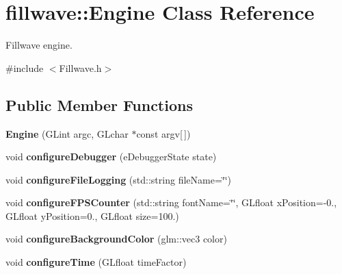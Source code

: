 \hypertarget{classfillwave_1_1Engine}{}\section{fillwave\+:\+:Engine Class Reference}
\label{classfillwave_1_1Engine}


Fillwave engine.  




{\ttfamily \#include $<$Fillwave.\+h$>$}

\subsection*{Public Member Functions}
\begin{DoxyCompactItemize}
\item 
\hypertarget{classfillwave_1_1Engine_a6348c216dda393c0ec969a1871f286b0}{}{\bfseries Engine} (G\+Lint argc, G\+Lchar $\ast$const argv\mbox{[}$\,$\mbox{]})\label{classfillwave_1_1Engine_a6348c216dda393c0ec969a1871f286b0}

\item 
\hypertarget{classfillwave_1_1Engine_a8ab70999c6424f4aff5eea39a23793fb}{}void {\bfseries configure\+Debugger} (e\+Debugger\+State state)\label{classfillwave_1_1Engine_a8ab70999c6424f4aff5eea39a23793fb}

\item 
\hypertarget{classfillwave_1_1Engine_a79b8431174a0e21ee33550bb17435572}{}void {\bfseries configure\+File\+Logging} (std\+::string file\+Name=\char`\"{}\char`\"{})\label{classfillwave_1_1Engine_a79b8431174a0e21ee33550bb17435572}

\item 
\hypertarget{classfillwave_1_1Engine_afeda6ab5368be17d98e6c1a703968ddd}{}void {\bfseries configure\+F\+P\+S\+Counter} (std\+::string font\+Name=\char`\"{}\char`\"{}, G\+Lfloat x\+Position=-\/0., G\+Lfloat y\+Position=0., G\+Lfloat size=100.)\label{classfillwave_1_1Engine_afeda6ab5368be17d98e6c1a703968ddd}

\item 
\hypertarget{classfillwave_1_1Engine_a317929adad6bac338fe9de406256aafc}{}void {\bfseries configure\+Background\+Color} (glm\+::vec3 color)\label{classfillwave_1_1Engine_a317929adad6bac338fe9de406256aafc}

\item 
\hypertarget{classfillwave_1_1Engine_afca8e958d13dc33cbe336db17bd2f1c7}{}void {\bfseries configure\+Time} (G\+Lfloat time\+Factor)\label{classfillwave_1_1Engine_afca8e958d13dc33cbe336db17bd2f1c7}


\end{DoxyCompactItemize}

